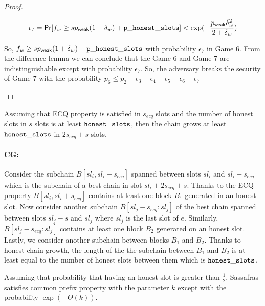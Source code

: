 \begin{proof}
\begin{enumerate}[label={{Game }}{{\arabic*}}]
	 \begin{equation}
	 \epsilon_7 = \mathsf{Pr}[f_w \geq sp_{\mathsf{weak}}(1+\delta_w) + \mathtt{p\_honest\_slots}] < \exp(-\frac{p_{\mathsf{weak}}\delta_w^2}{2 + \delta_w})
	 \end{equation}
	 
	So, $ f_w \geq  s p_{\mathsf{weak}}(1+\delta_w) + \mathtt{p\_honest\_slots} $ with probability $ \epsilon_7 $ in Game 6. From the difference lemma we can conclude that the Game 6 and Game 7 are indistinguishable except with probability $ \epsilon_7 $. So, the adversary breaks the security of Game 7 with the probability $ p_6 \leq p_2 - \epsilon_3  - \epsilon_4 - \epsilon_5 - \epsilon_6 -\epsilon_7 $   
	

\end{enumerate}	
\end{proof}


\begin{lemma}[CG]
	Assuming that ECQ property is satisfied in $ s_{ecq} $ slots and the number of honest slots in $ s $ slots is at least $ \mathtt{honest\_slots} $, then the chain grows at least $ \mathtt{honest\_slots} $ in $ 2s_{ecq} + s $ slots.
\end{lemma}
	\paragraph{CG:} Consider the subchain $ B[sl_i,sl_i+s_{ecq}] $ spanned between slots $ sl_i $ and $ sl_i + s_{ecq} $  which is the subchain of a best chain in slot $ sl_i +  2s_{ecq} + s  $. Thanks to the ECQ property $ B[sl_i,sl_i+s_{ecq}] $ contains at least one block $ B_1 $ generated in an honest slot.   Now consider another subchain $ B[sl_j -s_{ecq} :sl_j] $ of the best chain spanned between slots $ sl_j - s $ and $ sl_j $ where $ sl_j $  is the last slot of $ e $. Similarly, $ B[sl_j -s_{ecq} :sl_j] $ contains at least one block $ B_2 $ generated on an honest slot. Lastly, we consider another subchain between blocks $ B_1 $ and $ B_2 $.  Thanks to honest chain growth, the length of the the subchain between $ B_1 $ and $ B_2 $ is at least equal to the number of honest slots between them which is $ \mathtt{honest\_slots} $. 
	
	
\begin{lemma}[CP]
	Assuming that probability that having an honest slot is greater than $ \frac{1}{2} $, Sassafras satisfies common prefix property  with the parameter $ k $ except with the probability  $ \exp(-\Theta(k)) $. 
\end{lemma}
	
